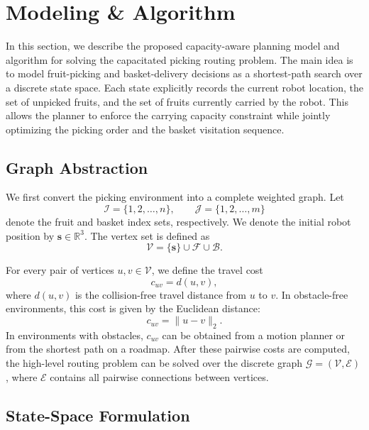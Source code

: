 \section{Modeling \& Algorithm}
\label{sec:methodology}

In this section, we describe the proposed capacity-aware planning model and algorithm for solving the capacitated picking routing problem. The main idea is to model fruit-picking and basket-delivery decisions as a shortest-path search over a discrete state space. Each state explicitly records the current robot location, the set of unpicked fruits, and the set of fruits currently carried by the robot. This allows the planner to enforce the carrying capacity constraint while jointly optimizing the picking order and the basket visitation sequence.

\subsection{Graph Abstraction}
\label{subsec:graph_abstraction}

We first convert the picking environment into a complete weighted graph. Let
\[
    \mathcal{I} = \{1,2,\dots,n\}, 
    \qquad
    \mathcal{J} = \{1,2,\dots,m\}
\]
denote the fruit and basket index sets, respectively. We denote the initial robot position by $\mathbf{s} \in \mathbb{R}^{3}$. The vertex set is defined as
\[
    \mathcal{V}
    =
    \{\mathbf{s}\}
    \cup
    \mathcal{F}
    \cup
    \mathcal{B}.
\]

For every pair of vertices $u,v\in\mathcal{V}$, we define the travel cost
\[
    c_{uv}=d(u,v),
\]
where $d(u,v)$ is the collision-free travel distance from $u$ to $v$. In obstacle-free environments, this cost is given by the Euclidean distance:
\begin{equation}
    c_{uv}
    =
    \|u-v\|_2.
\end{equation}
In environments with obstacles, $c_{uv}$ can be obtained from a motion planner or from the shortest path on a roadmap. After these pairwise costs are computed, the high-level routing problem can be solved over the discrete graph $\mathcal{G}=(\mathcal{V},\mathcal{E})$, where $\mathcal{E}$ contains all pairwise connections between vertices.

\subsection{State-Space Formulation}
\label{subsec:state_space_formulation}

